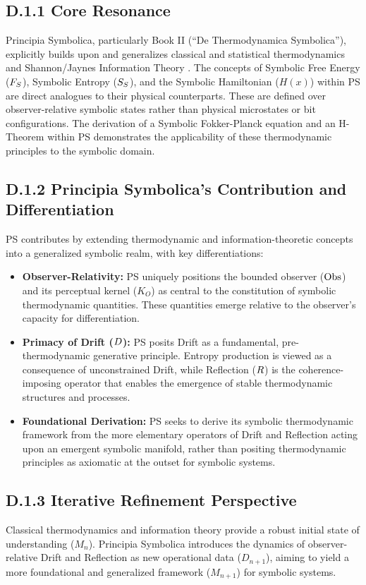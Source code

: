 \subsection*{D.1.1 Core Resonance}
\label{subsec:appD_core_resonance}
Principia Symbolica, particularly Book II (``De Thermodynamica Symbolica''), explicitly builds upon and generalizes classical and statistical thermodynamics \cite{callen1985thermodynamics} and Shannon/Jaynes Information Theory \cite{shannon1948}. The concepts of Symbolic Free Energy (\(F_S\)), Symbolic Entropy (\(S_S\)), and the Symbolic Hamiltonian (\(H(x)\)) within PS are direct analogues to their physical counterparts. These are defined over observer-relative symbolic states rather than physical microstates or bit configurations. The derivation of a Symbolic Fokker-Planck equation and an H-Theorem within PS demonstrates the applicability of these thermodynamic principles to the symbolic domain.
\subsection*{D.1.2 Principia Symbolica's Contribution and Differentiation} \label{subsec:appD_stat_thermo_contribution_differentiation}
PS contributes by extending thermodynamic and information-theoretic concepts into a generalized symbolic realm, with key differentiations:
\begin{itemize}
    \item \textbf{Observer-Relativity:} PS uniquely positions the bounded observer (\(\mathrm{Obs}\)) and its perceptual kernel (\(K_O\)) as central to the constitution of symbolic thermodynamic quantities. These quantities emerge relative to the observer's capacity for differentiation.
    \item \textbf{Primacy of Drift (\(D\)):} PS posits Drift as a fundamental, pre-thermodynamic generative principle. Entropy production is viewed as a consequence of unconstrained Drift, while Reflection (\(R\)) is the coherence-imposing operator that enables the emergence of stable thermodynamic structures and processes.
    \item \textbf{Foundational Derivation:} PS seeks to derive its symbolic thermodynamic framework from the more elementary operators of Drift and Reflection acting upon an emergent symbolic manifold, rather than positing thermodynamic principles as axiomatic at the outset for symbolic systems.
\end{itemize}
\subsection*{D.1.3 Iterative Refinement Perspective}
\label{subsec:appD_stat_thermo_iterative_refinement_perspective}
Classical thermodynamics and information theory provide a robust initial state of understanding (\(M_n\)). Principia Symbolica introduces the dynamics of observer-relative Drift and Reflection as new operational data (\(D_{n+1}\)), aiming to yield a more foundational and generalized framework (\(M_{n+1}\)) for symbolic systems.
